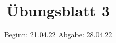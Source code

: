 

\title{Übungsblatt 3}
\date{%
  Beginn: 21.04.22
  \hspace{3em}
  Abgabe: 28.04.22
}



\maketitle
\thispagestyle{empty}
\tableofcontents
\newpage






